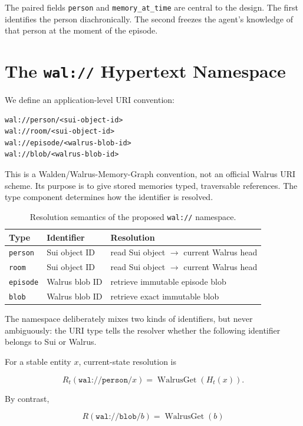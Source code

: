 \documentclass[11pt]{article}
\begin{document}
The paired fields \texttt{person} and \texttt{memory\_at\_time} are central to the design. The first identifies the person diachronically. The second freezes the agent's knowledge of that person at the moment of the episode.

\section{The \texttt{wal://} Hypertext Namespace}

We define an application-level URI convention:

\begin{lstlisting}
wal://person/<sui-object-id>
wal://room/<sui-object-id>
wal://episode/<walrus-blob-id>
wal://blob/<walrus-blob-id>
\end{lstlisting}

This is a Walden/Walrus-Memory-Graph convention, not an official Walrus URI scheme. Its purpose is to give stored memories typed, traversable references. The type component determines how the identifier is resolved.

\begin{table}[h]
\centering
\caption{Resolution semantics of the proposed \texttt{wal://} namespace.}
\begin{tabular}{lll}
\toprule
Type & Identifier & Resolution \\
\midrule
\texttt{person} & Sui object ID & read Sui object $\rightarrow$ current Walrus head \\
\texttt{room} & Sui object ID & read Sui object $\rightarrow$ current Walrus head \\
\texttt{episode} & Walrus blob ID & retrieve immutable episode blob \\
\texttt{blob} & Walrus blob ID & retrieve exact immutable blob \\
\bottomrule
\end{tabular}
\end{table}

The namespace deliberately mixes two kinds of identifiers, but never ambiguously: the URI type tells the resolver whether the following identifier belongs to Sui or Walrus.

For a stable entity $x$, current-state resolution is

\[
R_t(\texttt{wal://person/}x)=\operatorname{WalrusGet}(H_t(x)).
\]

By contrast,

\[
R(\texttt{wal://blob/}b)=\operatorname{WalrusGet}(b)
\]
\end{document}
